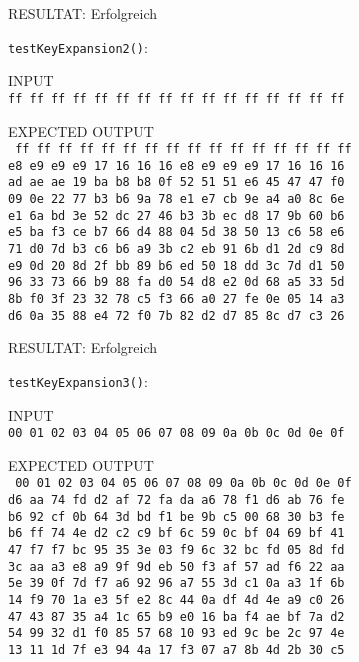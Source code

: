 \documentclass[12pt, letterpaper]{article}
\newcommand{\code}[1]{\texttt{#1}}
\begin{document}
RESULTAT: {\color{dgreen}Erfolgreich}

\newpage
\code{testKeyExpansion2()}:

INPUT\\
\code{ff ff ff ff ff ff ff ff ff ff ff ff ff ff ff ff}

EXPECTED OUTPUT\\
\code{
ff ff ff ff ff ff ff ff ff ff ff ff ff ff ff ff\\
e8 e9 e9 e9 17 16 16 16 e8 e9 e9 e9 17 16 16 16\\
ad ae ae 19 ba b8 b8 0f 52 51 51 e6 45 47 47 f0\\
09 0e 22 77 b3 b6 9a 78 e1 e7 cb 9e a4 a0 8c 6e\\
e1 6a bd 3e 52 dc 27 46 b3 3b ec d8 17 9b 60 b6\\
e5 ba f3 ce b7 66 d4 88 04 5d 38 50 13 c6 58 e6\\
71 d0 7d b3 c6 b6 a9 3b c2 eb 91 6b d1 2d c9 8d\\
e9 0d 20 8d 2f bb 89 b6 ed 50 18 dd 3c 7d d1 50\\
96 33 73 66 b9 88 fa d0 54 d8 e2 0d 68 a5 33 5d\\
8b f0 3f 23 32 78 c5 f3 66 a0 27 fe 0e 05 14 a3\\
d6 0a 35 88 e4 72 f0 7b 82 d2 d7 85 8c d7 c3 26
}

RESULTAT: {\color{dgreen}Erfolgreich}

\code{testKeyExpansion3()}:

INPUT\\
\code{00 01 02 03 04 05 06 07 08 09 0a 0b 0c 0d 0e 0f}

EXPECTED OUTPUT\\
\code{
00 01 02 03 04 05 06 07 08 09 0a 0b 0c 0d 0e 0f\\
d6 aa 74 fd d2 af 72 fa da a6 78 f1 d6 ab 76 fe\\
b6 92 cf 0b 64 3d bd f1 be 9b c5 00 68 30 b3 fe\\
b6 ff 74 4e d2 c2 c9 bf 6c 59 0c bf 04 69 bf 41\\
47 f7 f7 bc 95 35 3e 03 f9 6c 32 bc fd 05 8d fd\\
3c aa a3 e8 a9 9f 9d eb 50 f3 af 57 ad f6 22 aa\\
5e 39 0f 7d f7 a6 92 96 a7 55 3d c1 0a a3 1f 6b\\
14 f9 70 1a e3 5f e2 8c 44 0a df 4d 4e a9 c0 26\\
47 43 87 35 a4 1c 65 b9 e0 16 ba f4 ae bf 7a d2\\
54 99 32 d1 f0 85 57 68 10 93 ed 9c be 2c 97 4e\\
13 11 1d 7f e3 94 4a 17 f3 07 a7 8b 4d 2b 30 c5
}
\end{document}
